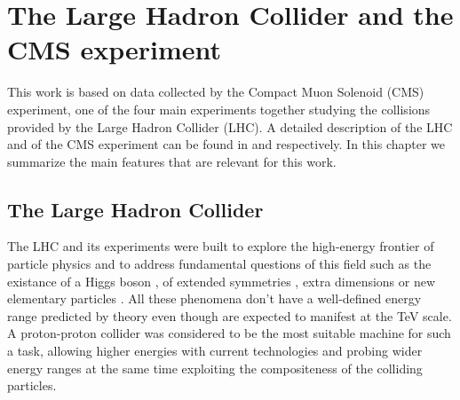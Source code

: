 \chapter{The Large Hadron Collider and the CMS experiment}

This work is based on data collected by the Compact Muon Solenoid (CMS) experiment, 
one of the four main experiments together studying the collisions 
provided by the Large Hadron Collider (LHC). A detailed description of the LHC and of the CMS 
experiment can be found in \cite{Evans:2006tq} and \cite{Chatrchyan:2008aa} respectively.
In this chapter we summarize the main features that are relevant for this work.

\section{The Large Hadron Collider}

The LHC and its experiments were built to explore the high-energy frontier of particle physics and to address fundamental questions of this field such as the existance of a Higgs boson \cite{Englert:1964et,Higgs:1964ia,Higgs:1964pj,Guralnik:1964eu,Higgs:1966ev,Kibble:1967sv}, of extended symmetries \cite{Martin:1997ns}, extra dimensions \cite{Antoniadis:1999bq} or new elementary particles \cite{Beltran:2010ww,Randall:1999vf}. All these phenomena don't have a well-defined energy range predicted by theory even though are expected to manifest at the TeV scale. A proton-proton collider was considered to be the most suitable machine for such a task, allowing higher energies with current technologies and probing wider energy ranges at the same time exploiting the compositeness of the colliding particles.

